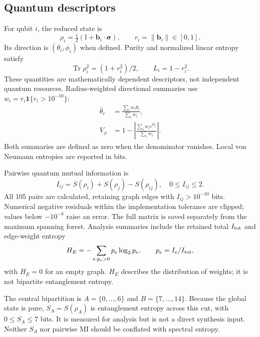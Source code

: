 \documentclass[pdflatex,iicol,sn-basic,Numbered]{sn-jnl}
\begin{document}
\subsection{Quantum descriptors}
For qubit $i$, the reduced state is
\begin{equation}
\rho_i=\tfrac12(\mathbb I+\mathbf b_i\cdot\boldsymbol\sigma),\qquad r_i=\|\mathbf b_i\|\in[0,1].
\end{equation}
Its direction is $(\theta_i,\phi_i)$ when defined. Purity and normalized linear entropy satisfy
\begin{equation}
\operatorname{Tr}\rho_i^2=(1+r_i^2)/2,\qquad L_i=1-r_i^2.
\end{equation}
These quantities are mathematically dependent descriptors, not independent quantum resources. Radius-weighted directional summaries use $w_i=r_i\mathbf1\{r_i>10^{-10}\}$:
\begin{align}
\bar\theta_r&=\frac{\sum_i w_i\theta_i}{\sum_i w_i},\\
V_\phi&=1-\left|\frac{\sum_i w_i e^{\mathrm i\phi_i}}{\sum_i w_i}\right|.
\end{align}
Both summaries are defined as zero when the denominator vanishes. Local von Neumann entropies are reported in bits.

Pairwise quantum mutual information is
\begin{equation}
I_{ij}=S(\rho_i)+S(\rho_j)-S(\rho_{ij}),\quad 0\le I_{ij}\le2.
\end{equation}
All 105 pairs are calculated, retaining graph edges with $I_{ij}>10^{-10}$ bits. Numerical negative residuals within the implementation tolerance are clipped; values below $-10^{-8}$ raise an error. The full matrix is saved separately from the maximum spanning forest. Analysis summaries include the retained total $I_{\rm tot}$ and edge-weight entropy
\begin{equation}
H_E=-\sum_{e:p_e>0}p_e\log_2p_e,\qquad p_e=I_e/I_{\rm tot},
\end{equation}
with $H_E=0$ for an empty graph. $H_E$ describes the distribution of weights; it is not bipartite entanglement entropy.

The central bipartition is $A=\{0,\ldots,6\}$ and $B=\{7,\ldots,14\}$. Because the global state is pure, $S_A=S(\rho_A)$ is entanglement entropy across this cut, with $0\le S_A\le7$ bits. It is measured for analysis but is not a direct synthesis input. Neither $S_A$ nor pairwise MI should be conflated with spectral entropy.
\end{document}
